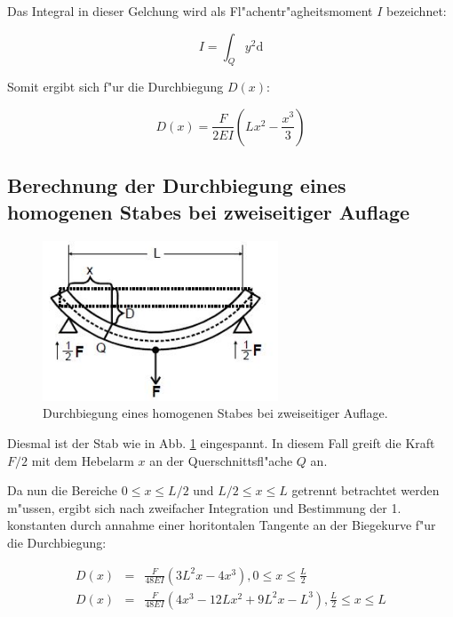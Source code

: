 Das Integral in dieser Gelchung wird als Fl"achentr"agheitsmoment $I$ bezeichnet:

\begin{equation}
I = \int_Q y^2 \mathrm{d} \label{eqn:flaechentraegheit}
\end{equation}

Somit ergibt sich f"ur die Durchbiegung $D(x)$:

\begin{equation}
D(x) = \frac{F}{2EI} \left( Lx^2- \frac{x^3}{3} \right) \label{eqn:einseitig}
\end{equation}

\subsection{Berechnung der Durchbiegung eines homogenen Stabes bei zweiseitiger Auflage} %
\label{sub:2}

\begin{figure}[!h]
\centering
\includegraphics[width = 7cm]{img/biegung2.JPG}
\caption{Durchbiegung eines homogenen Stabes bei zweiseitiger Auflage.}
\label{fg:biegung2}
\end{figure}

Diesmal ist der Stab wie in Abb. \ref{fg:biegung2} eingespannt. In diesem Fall greift die Kraft $F/2$ mit dem Hebelarm $x$ an der Querschnittsfl"ache $Q$ an.

Da nun die Bereiche $0 \leq x \leq L/2$ und $L/2 \leq x \leq L$ getrennt betrachtet werden m"ussen, ergibt sich nach zweifacher Integration und Bestimmung der 1. konstanten durch annahme einer horitontalen Tangente an der Biegekurve f"ur die Durchbiegung:

\begin{eqnarray}
D(x) &=& \frac{F}{48EI}(3L^2x-4x^3) , 0 \leq x \leq \frac{L}{2} \\
D(x) &=& \frac{F}{48EI}(4x^3-12Lx^2+9L^2x-L^3) , \frac{L}{2} \leq x \leq L
\end{eqnarray}